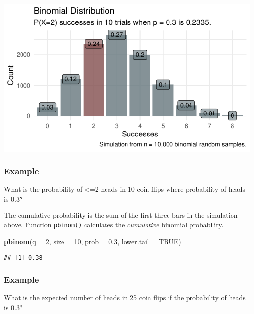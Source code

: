 \documentclass[
]{book}
\newenvironment{Shaded}{\begin{snugshade}}{\end{snugshade}}
\newcommand{\DataTypeTok}[1]{\textcolor[rgb]{0.13,0.29,0.53}{#1}}
\newcommand{\DecValTok}[1]{\textcolor[rgb]{0.00,0.00,0.81}{#1}}
\newcommand{\FloatTok}[1]{\textcolor[rgb]{0.00,0.00,0.81}{#1}}
\newcommand{\KeywordTok}[1]{\textcolor[rgb]{0.13,0.29,0.53}{\textbf{#1}}}
\newcommand{\NormalTok}[1]{#1}
\newcommand{\OtherTok}[1]{\textcolor[rgb]{0.56,0.35,0.01}{#1}}
\begin{document}
\includegraphics{data-sci_files/figure-latex/unnamed-chunk-3-1.pdf}

\hypertarget{example-1}{%
\subsubsection*{Example}\label{example-1}}

What is the probability of \textless=2 heads in 10 coin flips where probability of heads is 0.3?

The cumulative probability is the sum of the first three bars in the simulation above. Function \texttt{pbinom()} calculates the \emph{cumulative} binomial probability.

\begin{Shaded}
\begin{Highlighting}[]
\KeywordTok{pbinom}\NormalTok{(}\DataTypeTok{q =} \DecValTok{2}\NormalTok{, }\DataTypeTok{size =} \DecValTok{10}\NormalTok{, }\DataTypeTok{prob =} \FloatTok{0.3}\NormalTok{, }\DataTypeTok{lower.tail =} \OtherTok{TRUE}\NormalTok{)}
\end{Highlighting}
\end{Shaded}

\begin{verbatim}
## [1] 0.38
\end{verbatim}

\hypertarget{example-2}{%
\subsubsection*{Example}\label{example-2}}

What is the expected number of heads in 25 coin flips if the probability of heads is 0.3?
\end{document}
